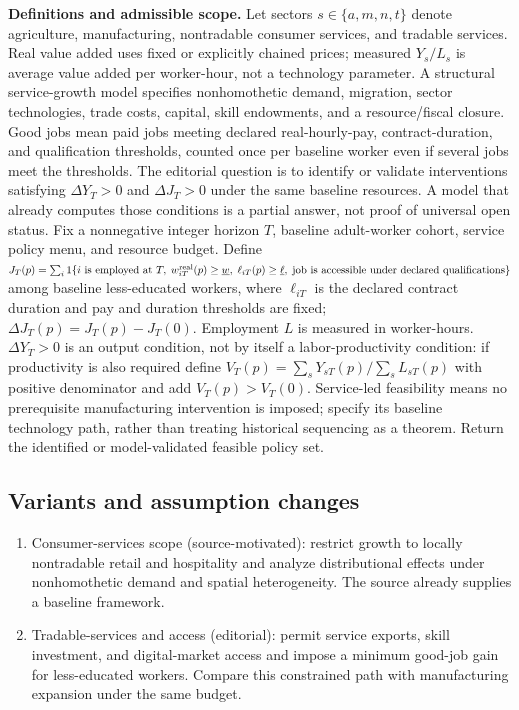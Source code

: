 \documentclass[11pt,a4paper]{article}
\begin{document}
\textbf{Definitions and admissible scope.} Let sectors \(s\in\{a,m,n,t\}\) denote agriculture, manufacturing, nontradable consumer services, and tradable services. Real value added uses fixed or explicitly chained prices; measured \(Y_s/L_s\) is average value added per worker-hour, not a technology parameter. A structural service-growth model specifies nonhomothetic demand, migration, sector technologies, trade costs, capital, skill endowments, and a resource/fiscal closure. Good jobs mean paid jobs meeting declared real-hourly-pay, contract-duration, and qualification thresholds, counted once per baseline worker even if several jobs meet the thresholds. The editorial question is to identify or validate interventions satisfying \(\Delta Y_T>0\) and \(\Delta J_T>0\) under the same baseline resources. A model that already computes those conditions is a partial answer, not proof of universal open status. Fix a nonnegative integer horizon \(T\), baseline adult-worker cohort, service policy menu, and resource budget. Define \(J_T(p)=\sum_i1\{i\text{ is employed at }T,\;w^{\rm real}_{iT}(p)\ge\underline w,\;\ell_{iT}(p)\ge\underline\ell,\;\text{job is accessible under declared qualifications}\}\) among baseline less-educated workers, where \(\ell_{iT}\) is the declared contract duration and pay and duration thresholds are fixed; \(\Delta J_T(p)=J_T(p)-J_T(0)\). Employment \(L\) is measured in worker-hours. \(\Delta Y_T>0\) is an output condition, not by itself a labor-productivity condition: if productivity is also required define \(V_T(p)=\sum_sY_{sT}(p)/\sum_sL_{sT}(p)\) with positive denominator and add \(V_T(p)>V_T(0)\). Service-led feasibility means no prerequisite manufacturing intervention is imposed; specify its baseline technology path, rather than treating historical sequencing as a theorem. Return the identified or model-validated feasible policy set.
\subsection*{Variants and assumption changes}
\begin{enumerate}
\item Consumer-services scope (source-motivated): restrict growth to locally nontradable retail and hospitality and analyze distributional effects under nonhomothetic demand and spatial heterogeneity. The source already supplies a baseline framework.
\item Tradable-services and access (editorial): permit service exports, skill investment, and digital-market access and impose a minimum good-job gain for less-educated workers. Compare this constrained path with manufacturing expansion under the same budget.
\end{enumerate}
\end{document}
